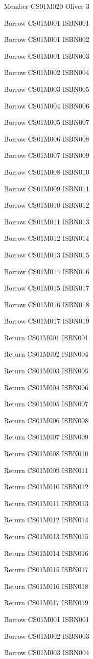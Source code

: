 Member
CS01M020 Oliver 3

Borrow
CS01M001 ISBN001

Borrow
CS01M001 ISBN002

Borrow
CS01M001 ISBN003

Borrow
CS01M002 ISBN004

Borrow
CS01M003 ISBN005

Borrow
CS01M004 ISBN006

Borrow
CS01M005 ISBN007

Borrow
CS01M006 ISBN008

Borrow
CS01M007 ISBN009

Borrow
CS01M008 ISBN010

Borrow
CS01M009 ISBN011

Borrow
CS01M010 ISBN012

Borrow
CS01M011 ISBN013

Borrow
CS01M012 ISBN014

Borrow
CS01M013 ISBN015

Borrow
CS01M014 ISBN016

Borrow
CS01M015 ISBN017

Borrow
CS01M016 ISBN018

Borrow
CS01M017 ISBN019

Return
CS01M001 ISBN001

Return
CS01M002 ISBN004

Return
CS01M003 ISBN005

Return
CS01M004 ISBN006

Return
CS01M005 ISBN007

Return
CS01M006 ISBN008

Return
CS01M007 ISBN009

Return
CS01M008 ISBN010

Return
CS01M009 ISBN011

Return
CS01M010 ISBN012

Return
CS01M011 ISBN013

Return
CS01M012 ISBN014

Return
CS01M013 ISBN015

Return
CS01M014 ISBN016

Return
CS01M015 ISBN017

Return
CS01M016 ISBN018

Return
CS01M017 ISBN019

Borrow
CS01M001 ISBN001

Borrow
CS01M002 ISBN003

Borrow
CS01M003 ISBN004

